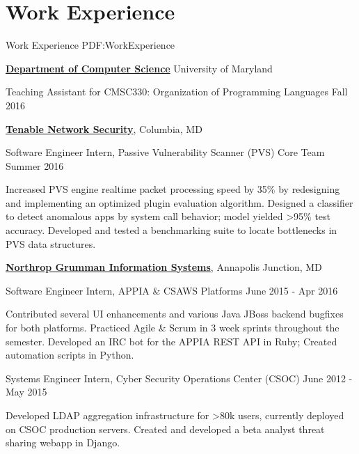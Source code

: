 
\section
{Work Experience}
{Work Experience}
{PDF:WorkExperience}

\href{https://cs.umd.edu/}
{\textbf{Department of Computer Science}}
University of Maryland
\hfill

\GapNoBreak
\hspace{1em} Teaching Assistant for CMSC330: Organization of Programming Languages
\hfill
Fall 2016

\GapNoBreak
\href{https://www.tenable.com/}
{\textbf{Tenable Network Security}},
Columbia, MD

\GapNoBreak
\hspace{1em} Software Engineer Intern, Passive Vulnerability Scanner (PVS) Core Team
\hfill
Summer 2016
\begin{detail}
\SubBulletItem
Increased PVS engine realtime packet processing speed by 35\% by redesigning and implementing an optimized plugin evaluation algorithm.
\SubBulletItem
Designed a classifier to detect anomalous apps by system call behavior; model yielded >95\% test accuracy.
\SubBulletItem
Developed and tested a benchmarking suite to locate bottlenecks in PVS data structures.
\end{detail}

\Gap
\href{https://www.ngc.com/}
{\textbf{Northrop Grumman Information Systems}},
Annapolis Junction, MD

\GapNoBreak
\hspace{1em} 
Software Engineer Intern, APPIA \& CSAWS Platforms
\hfill
June 2015 - Apr 2016
\begin{detail}
\SubBulletItem
Contributed several UI enhancements and various Java JBoss backend bugfixes for both platforms.
\SubBulletItem
Practiced Agile \& Scrum in 3 week sprints throughout the semester.
\SubBulletItem
Developed an IRC bot for the APPIA REST API in Ruby; Created automation scripts in Python.
\end{detail}

\GapNoBreak
\hspace{1em} 
Systems Engineer Intern, Cyber Security Operations Center (CSOC)
\hfill
June 2012 - May 2015
\begin{detail}
\SubBulletItem
Developed LDAP aggregation infrastructure for >80k users, currently deployed on CSOC production servers.
\SubBulletItem
Created and developed a beta analyst threat sharing webapp in Django.
\end{detail}
